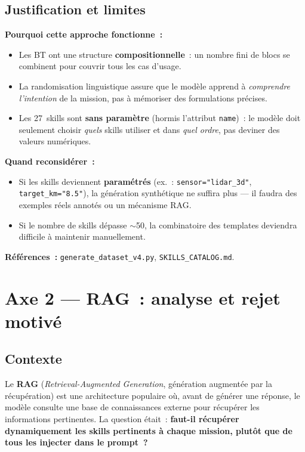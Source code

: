\documentclass[a4paper,11pt]{article}
\newcommand{\file}[1]{\texttt{#1}}
\begin{document}
\subsection{Justification et limites}

\textbf{Pourquoi cette approche fonctionne~:}
\begin{itemize}
    \item Les BT ont une structure \textbf{compositionnelle}~: un nombre
    fini de blocs se combinent pour couvrir tous les cas d'usage.
    \item La randomisation linguistique assure que le modèle apprend à
    \emph{comprendre l'intention} de la mission, pas à mémoriser des
    formulations précises.
    \item Les 27~skills sont \textbf{sans paramètre} (hormis l'attribut
    \texttt{name})~: le modèle doit seulement choisir \emph{quels} skills
    utiliser et dans \emph{quel ordre}, pas deviner des valeurs numériques.
\end{itemize}

\textbf{Quand reconsidérer~:}
\begin{itemize}
    \item Si les skills deviennent \textbf{paramétrés} (ex.~:
    \texttt{sensor="lidar\_3d"}, \texttt{target\_km="8.5"}), la génération
    synthétique ne suffira plus --- il faudra des exemples réels annotés ou
    un mécanisme RAG.
    \item Si le nombre de skills dépasse $\sim$50, la combinatoire des
    templates deviendra difficile à maintenir manuellement.
\end{itemize}

\textbf{Références~:} \file{generate\_dataset\_v4.py},
\file{SKILLS\_CATALOG.md}.

\newpage
\section{Axe 2 --- RAG~: analyse et rejet motivé}
\label{sec:rag}

\subsection{Contexte}

Le \textbf{RAG} (\emph{Retrieval-Augmented Generation}, génération augmentée
par la récupération) est une architecture populaire où, avant de générer une
réponse, le modèle consulte une base de connaissances externe pour récupérer
les informations pertinentes. La question était~: \textbf{faut-il récupérer
dynamiquement les skills pertinents à chaque mission, plutôt que de tous les
injecter dans le prompt~?}
\end{document}

